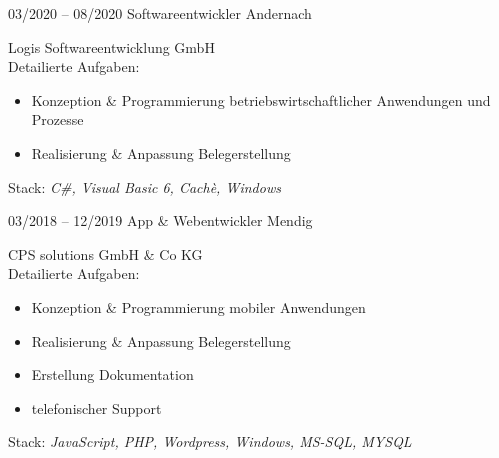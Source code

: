\documentclass[a4paper]{friggeri-cv} %
\begin{document}
\begin{entrylist}
\entry
{03/2020 -- 08/2020}
{Softwareentwickler}
{Andernach}
{Logis Softwareentwicklung GmbH\\
	Detailierte Aufgaben:
	\begin{itemize}
		\item Konzeption \& Programmierung betriebswirtschaftlicher Anwendungen und Prozesse
		\item Realisierung \& Anpassung Belegerstellung
	\end{itemize}
	Stack: \textit{C\#, Visual Basic 6, Cachè, Windows}
}
\entry
{03/2018 -- 12/2019}
{App \& Webentwickler}
{Mendig}
{CPS solutions GmbH \& Co KG\\
	Detailierte Aufgaben:
	\begin{itemize}
		\item Konzeption \& Programmierung mobiler Anwendungen
		\item Realisierung \& Anpassung Belegerstellung
        	\item Erstellung Dokumentation
        	\item telefonischer Support
	\end{itemize}
	Stack: \textit{JavaScript, PHP, Wordpress, Windows, MS-SQL, MYSQL}
}


\end{entrylist}
\end{document}
